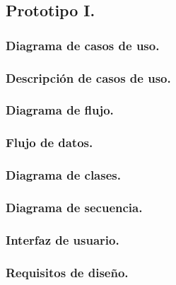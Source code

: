 \documentclass[12pt, a4paper, titlepage]{article}
\begin{document}
		\subsection{Prototipo I.}
			\subsubsection{Diagrama de casos de uso.}
			\subsubsection{Descripción de casos de uso.}
			\subsubsection{Diagrama de flujo.}
			\subsubsection{Flujo de datos.}
			\subsubsection{Diagrama de clases.}
			\subsubsection{Diagrama de secuencia.}
			\subsubsection{Interfaz de usuario.}
			\subsubsection{Requisitos de diseño.}
			
\end{document}
